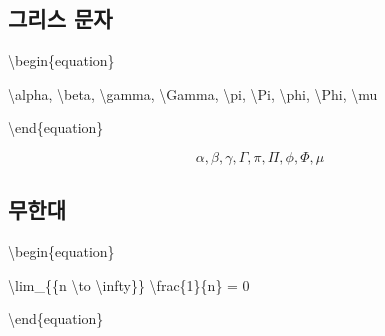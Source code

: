 \documentclass[
  letterpaper,
]{book}
\newenvironment{Shaded}{\begin{snugshade}}{\end{snugshade}}
\newcommand{\ExtensionTok}[1]{\textcolor[rgb]{0.00,0.23,0.31}{#1}}
\newcommand{\KeywordTok}[1]{\textcolor[rgb]{0.00,0.23,0.31}{#1}}
\newcommand{\NormalTok}[1]{\textcolor[rgb]{0.00,0.23,0.31}{#1}}
\newcommand{\SpecialCharTok}[1]{\textcolor[rgb]{0.37,0.37,0.37}{#1}}
\newcommand{\SpecialStringTok}[1]{\textcolor[rgb]{0.13,0.47,0.30}{#1}}
\begin{document}
\hypertarget{uxadf8uxb9acuxc2a4-uxbb38uxc790}{%
\subsection{그리스 문자}\label{uxadf8uxb9acuxc2a4-uxbb38uxc790}}

\begin{Shaded}
\begin{Highlighting}[]
\KeywordTok{\textbackslash{}begin}\NormalTok{\{}\ExtensionTok{equation}\NormalTok{\}}

\SpecialCharTok{\textbackslash{}alpha}\SpecialStringTok{, }\SpecialCharTok{\textbackslash{}beta}\SpecialStringTok{, }\SpecialCharTok{\textbackslash{}gamma}\SpecialStringTok{, }\SpecialCharTok{\textbackslash{}Gamma}\SpecialStringTok{, }\SpecialCharTok{\textbackslash{}pi}\SpecialStringTok{, }\SpecialCharTok{\textbackslash{}Pi}\SpecialStringTok{, }\SpecialCharTok{\textbackslash{}phi}\SpecialStringTok{, }\SpecialCharTok{\textbackslash{}Phi}\SpecialStringTok{, }\SpecialCharTok{\textbackslash{}mu}

\KeywordTok{\textbackslash{}end}\NormalTok{\{}\ExtensionTok{equation}\NormalTok{\}}
\end{Highlighting}
\end{Shaded}

\begin{equation}

\alpha, \beta, \gamma, \Gamma, \pi, \Pi, \phi, \Phi, \mu

\end{equation}

\hypertarget{uxbb34uxd55cuxb300}{%
\subsection{무한대}\label{uxbb34uxd55cuxb300}}

\begin{Shaded}
\begin{Highlighting}[]
\KeywordTok{\textbackslash{}begin}\NormalTok{\{}\ExtensionTok{equation}\NormalTok{\}}

\SpecialCharTok{\textbackslash{}lim}\SpecialStringTok{\_\{\{n }\SpecialCharTok{\textbackslash{}to}\SpecialStringTok{ }\SpecialCharTok{\textbackslash{}infty}\SpecialStringTok{\}\} }\SpecialCharTok{\textbackslash{}frac}\SpecialStringTok{\{1\}\{n\} = 0}

\KeywordTok{\textbackslash{}end}\NormalTok{\{}\ExtensionTok{equation}\NormalTok{\}}
\end{Highlighting}
\end{Shaded}
\end{document}
